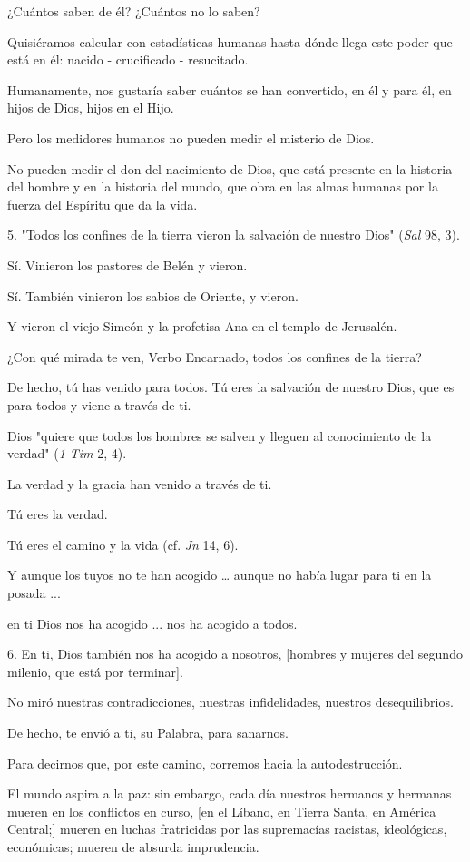¿Cuántos saben de él? ¿Cuántos no lo saben?

Quisiéramos calcular con estadísticas humanas hasta dónde llega este
poder que está en él: nacido - crucificado - resucitado.

Humanamente, nos gustaría saber cuántos se han convertido, en él y para
él, en hijos de Dios, hijos en el Hijo.

Pero los medidores humanos no pueden medir el misterio de Dios.

No pueden medir el don del nacimiento de Dios, que está presente en la
historia del hombre y en la historia del mundo, que obra en las almas
humanas por la fuerza del Espíritu que da la vida.

5. "Todos los confines de la tierra vieron la salvación de nuestro Dios"
(\emph{Sal} 98, 3).

Sí. Vinieron los pastores de Belén y vieron.

Sí. También vinieron los sabios de Oriente, y vieron.

Y vieron el viejo Simeón y la profetisa Ana en el templo de Jerusalén.

¿Con qué mirada te ven, Verbo Encarnado, todos los confines de la
tierra?

De hecho, tú has venido para todos. Tú eres la salvación de nuestro
Dios, que es para todos y viene a través de ti.

Dios "quiere que todos los hombres se salven y lleguen al conocimiento
de la verdad" (\emph{1 Tim} 2, 4).

La verdad y la gracia han venido a través de ti.

Tú eres la verdad.

Tú eres el camino y la vida (cf. \emph{Jn} 14, 6).

Y aunque los tuyos no te han acogido \ldots{} aunque no había lugar para
ti en la posada ...

en ti Dios nos ha acogido ... nos ha acogido a todos.

6. En ti, Dios también nos ha acogido a nosotros, {[}hombres y mujeres
del segundo milenio, que está por terminar{]}.

No miró nuestras contradicciones, nuestras infidelidades, nuestros
desequilibrios.

De hecho, te envió a ti, su Palabra, para sanarnos.

Para decirnos que, por este camino, corremos hacia la autodestrucción.

El mundo aspira a la paz: sin embargo, cada día nuestros hermanos y
hermanas mueren en los conflictos en curso, {[}en el Líbano, en Tierra
Santa, en América Central;{]} mueren en luchas fratricidas por las
supremacías racistas, ideológicas, económicas; mueren de absurda
imprudencia.

